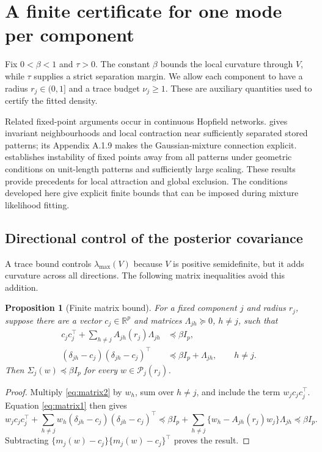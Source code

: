 \documentclass[12pt,a4paper]{article}
\newtheorem{proposition}[theorem]{Proposition}
\theoremstyle{remark}
\newcommand{\R}{\mathbb R}
\begin{document}
\section{A finite certificate for one mode per component}\label{sec:certificate}

Fix $0<\beta<1$ and $\tau>0$. The constant $\beta$ bounds the local curvature through $V$, while $\tau$ supplies a strict separation margin. We allow each component to have a radius $r_j\in(0,1]$ and a trace budget $\nu_j\ge1$. These are auxiliary quantities used to certify the fitted density.

Related fixed-point arguments occur in continuous Hopfield networks. \citet[Appendix A.1.5.3]{ramsauer2021} gives invariant neighbourhoods and local contraction near sufficiently separated stored patterns; its Appendix A.1.9 makes the Gaussian-mixture connection explicit. \citet[Lemma 3.4 of the author version]{beise2026} establishes instability of fixed points away from all patterns under geometric conditions on unit-length patterns and sufficiently large scaling. These results provide precedents for local attraction and global exclusion. The conditions developed here give explicit finite bounds that can be imposed during mixture likelihood fitting.

\subsection{Directional control of the posterior covariance}

A trace bound controls $\lambda_{\max}(V)$ because $V$ is positive semidefinite, but it adds curvature across all directions. The following matrix inequalities avoid this addition.

\begin{proposition}[Finite matrix bound]\label{prop:matrix}
For a fixed component $j$ and radius $r_j$, suppose there are a vector $c_j\in\R^p$ and matrices $\Lambda_{jh}\succeq0$, $h\ne j$, such that
\begin{align}
 c_jc_j^\top+\sum_{h\ne j}A_{jh}(r_j)\Lambda_{jh}
      &\preceq\beta I_p,\label{eq:matrix1}\\
 (\delta_{jh}-c_j)(\delta_{jh}-c_j)^\top
      &\preceq\beta I_p+\Lambda_{jh},\qquad h\ne j.\label{eq:matrix2}
\end{align}
Then $\Sigma_j(w)\preceq\beta I_p$ for every $w\in\mathcal P_j(r_j)$.
\end{proposition}

\begin{proof}
Multiply \eqref{eq:matrix2} by $w_h$, sum over $h\ne j$, and include the term $w_jc_jc_j^\top$. Equation \eqref{eq:matrix1} then gives
\[
 w_jc_jc_j^\top+
 \sum_{h\ne j}w_h(\delta_{jh}-c_j)(\delta_{jh}-c_j)^\top
 \preceq \beta I_p+
 \sum_{h\ne j}\{w_h-A_{jh}(r_j)w_j\}\Lambda_{jh}
 \preceq\beta I_p.
\]
Subtracting $\{m_j(w)-c_j\}\{m_j(w)-c_j\}^\top$ proves the result.
\end{proof}
\end{document}

